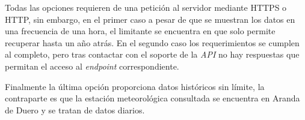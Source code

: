 Todas las opciones requieren de una petición al servidor mediante HTTPS o HTTP, sin 
embargo, en el primer caso a pesar de que se muestran los datos en una frecuencia 
de una hora, el limitante se encuentra en que solo permite recuperar hasta un año atrás.
En el segundo caso los requerimientos se cumplen al completo, pero tras contactar con el
soporte de la \textit{API} no hay respuestas que permitan el acceso al 
\textit{endpoint} correspondiente.

Finalmente la última opción proporciona datos históricos sin límite, la contraparte es
que la estación meteorológica consultada se encuentra en Aranda de Duero y se tratan de
datos diarios.
